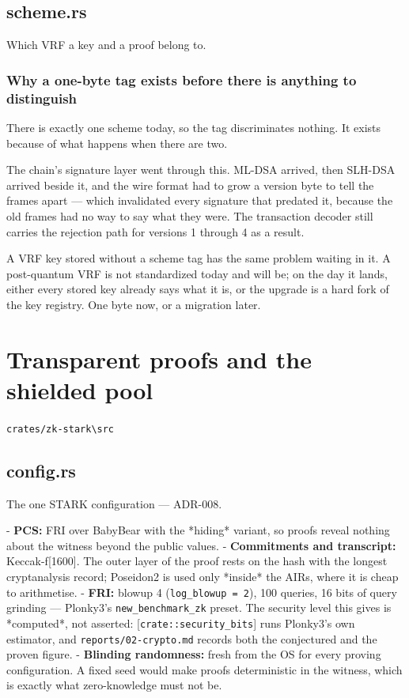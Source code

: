 \documentclass[11pt,a4paper]{article}
\begin{document}
\subsection{scheme.rs}
Which VRF a key and a proof belong to.

\subsubsection{Why a one-byte tag exists before there is anything to distinguish}

There is exactly one scheme today, so the tag discriminates nothing. It
exists because of what happens when there are two.

The chain's signature layer went through this. ML-DSA arrived, then SLH-DSA
arrived beside it, and the wire format had to grow a version byte to tell
the frames apart — which invalidated every signature that predated it,
because the old frames had no way to say what they were. The transaction
decoder still carries the rejection path for versions 1 through 4 as a
result.

A VRF key stored without a scheme tag has the same problem waiting in it. A
post-quantum VRF is not standardized today and will be; on the day it lands,
either every stored key already says what it is, or the upgrade is a hard
fork of the key registry. One byte now, or a migration later.

\section{Transparent proofs and the shielded pool}
\noindent\texttt{crates/zk-stark\textbackslash{}src}

\subsection{config.rs}
The one STARK configuration — ADR-008.

- \textbf{PCS:} FRI over BabyBear with the *hiding* variant, so proofs reveal
  nothing about the witness beyond the public values.
- \textbf{Commitments and transcript:} Keccak-f[1600]. The outer layer of the
  proof rests on the hash with the longest cryptanalysis record; Poseidon2
  is used only *inside* the AIRs, where it is cheap to arithmetise.
- \textbf{FRI:} blowup 4 (\texttt{log\_blowup = 2}), 100 queries, 16 bits of query
  grinding — Plonky3's \texttt{new\_benchmark\_zk} preset. The security level this
  gives is *computed*, not asserted: [\texttt{crate::security\_bits}] runs
  Plonky3's own estimator, and \texttt{reports/02-crypto.md} records both the
  conjectured and the proven figure.
- \textbf{Blinding randomness:} fresh from the OS for every proving
  configuration. A fixed seed would make proofs deterministic in the
  witness, which is exactly what zero-knowledge must not be.
\end{document}
